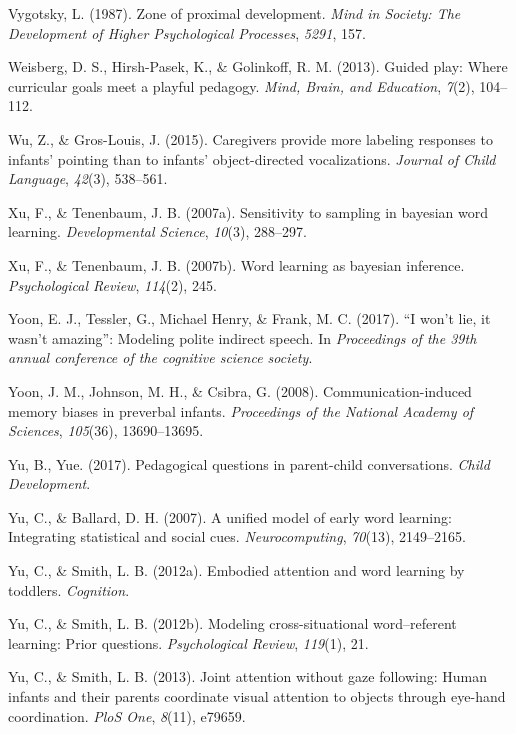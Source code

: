 \documentclass[english,floatsintext,man]{apa6}
\theoremstyle{definition}
\theoremstyle{definition}
\theoremstyle{definition}
\theoremstyle{remark}
\begin{document}
\hypertarget{ref-vygotsky1987zone}{}
Vygotsky, L. (1987). Zone of proximal development. \emph{Mind in
Society: The Development of Higher Psychological Processes},
\emph{5291}, 157.

\hypertarget{ref-weisberg2013guided}{}
Weisberg, D. S., Hirsh-Pasek, K., \& Golinkoff, R. M. (2013). Guided
play: Where curricular goals meet a playful pedagogy. \emph{Mind, Brain,
and Education}, \emph{7}(2), 104--112.

\hypertarget{ref-wu2015caregivers}{}
Wu, Z., \& Gros-Louis, J. (2015). Caregivers provide more labeling
responses to infants' pointing than to infants' object-directed
vocalizations. \emph{Journal of Child Language}, \emph{42}(3), 538--561.

\hypertarget{ref-xu2007sampling}{}
Xu, F., \& Tenenbaum, J. B. (2007a). Sensitivity to sampling in bayesian
word learning. \emph{Developmental Science}, \emph{10}(3), 288--297.

\hypertarget{ref-xu2007word}{}
Xu, F., \& Tenenbaum, J. B. (2007b). Word learning as bayesian
inference. \emph{Psychological Review}, \emph{114}(2), 245.

\hypertarget{ref-yoonwon}{}
Yoon, E. J., Tessler, G., Michael Henry, \& Frank, M. C. (2017). ``I
won't lie, it wasn't amazing'': Modeling polite indirect speech. In
\emph{Proceedings of the 39th annual conference of the cognitive science
society}.

\hypertarget{ref-yoon2008communication}{}
Yoon, J. M., Johnson, M. H., \& Csibra, G. (2008). Communication-induced
memory biases in preverbal infants. \emph{Proceedings of the National
Academy of Sciences}, \emph{105}(36), 13690--13695.

\hypertarget{ref-yu2017peagogical}{}
Yu, B., Yue. (2017). Pedagogical questions in parent-child
conversations. \emph{Child Development}.

\hypertarget{ref-yu2007unified}{}
Yu, C., \& Ballard, D. H. (2007). A unified model of early word
learning: Integrating statistical and social cues.
\emph{Neurocomputing}, \emph{70}(13), 2149--2165.

\hypertarget{ref-yu2012embodied}{}
Yu, C., \& Smith, L. B. (2012a). Embodied attention and word learning by
toddlers. \emph{Cognition}.

\hypertarget{ref-yu2012modeling}{}
Yu, C., \& Smith, L. B. (2012b). Modeling cross-situational
word--referent learning: Prior questions. \emph{Psychological Review},
\emph{119}(1), 21.

\hypertarget{ref-yu2013joint}{}
Yu, C., \& Smith, L. B. (2013). Joint attention without gaze following:
Human infants and their parents coordinate visual attention to objects
through eye-hand coordination. \emph{PloS One}, \emph{8}(11), e79659.
\end{document}
